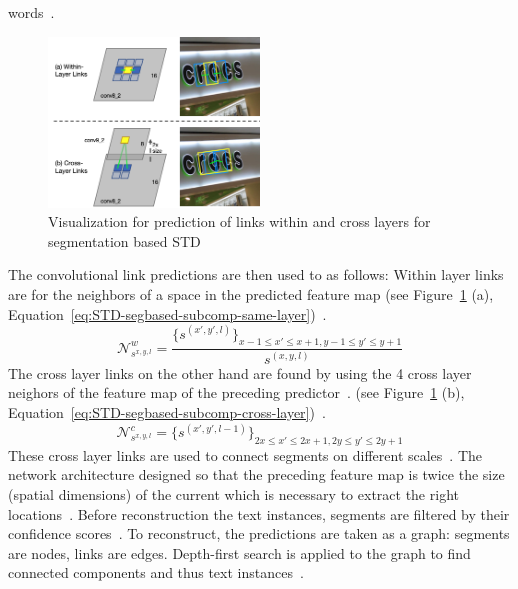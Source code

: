 words~\citep{shi_detecting_2017}.
\begin{figure}[ht]
    \centering
    \includegraphics[width=0.5\textwidth]{img/STD-seg-based-links-Shi-Detecting-2017.png}
    \caption[Predicting links for segmentation based STD]{%
        Visualization for prediction of links within and cross layers for segmentation based
        STD~\citep{shi_detecting_2017}\label{fig:STD-segbased-component-links}
    }
\end{figure}
The convolutional link predictions are then used to as follows:
Within layer links are for the neighbors of a space in the predicted feature map
(see Figure~\ref{fig:STD-segbased-component-links} (a),
Equation~\ref{eq:STD-segbased-subcomp-same-layer})~\citep{shi_detecting_2017}.
\begin{equation}\label{eq:STD-segbased-subcomp-same-layer}
    \mathcal{N}_{s^{x,y,l}}^w =
        \frac{{\{s^{(x',y',l)}\}}_{x-1\leq x'\leq x+1,y-1\leq y'\leq y+1}}{s^{(x,y,l)}}
\end{equation}
The cross layer links on the other hand are found by using the 4 cross layer neighors of the
feature map of the preceding predictor~\citep{shi_detecting_2017}.
(see Figure~\ref{fig:STD-segbased-component-links} (b),
Equation~\ref{eq:STD-segbased-subcomp-cross-layer})~\citep{shi_detecting_2017}.
\begin{equation}\label{eq:STD-segbased-subcomp-cross-layer}
    \mathcal{N}_{s^{x,y,l}}^c = {\{s^{(x',y',l-1)}\}}_{2x\leq x'\leq 2x+1,2y\leq y'\leq 2y+1}
\end{equation}
These cross layer links are used to connect segments on different scales~\citep{shi_detecting_2017}.
The network architecture designed so that the preceding feature map is twice the size (spatial
dimensions) of the current which is necessary to extract the right
locations~\citep{shi_detecting_2017}.
Before reconstruction the text instances, segments are filtered by their confidence
scores~\citep{shi_detecting_2017}.
To reconstruct, the predictions are taken as a graph: segments are nodes, links are edges.
Depth-first search is applied to the graph to find connected components and thus text
instances~\citep{shi_detecting_2017}.

